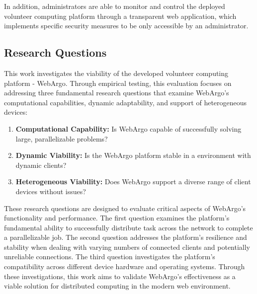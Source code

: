 In addition, administrators are able to monitor and control the deployed volunteer computing platform through a transparent web application, which implements specific security measures to be only accessible by an administrator.

\subsection{Research Questions}
\label{subsec:into:objectives:questions}
This work investigates the viability of the developed volunteer computing platform - WebArgo. Through empirical testing, this evaluation focuses on addressing three fundamental research questions that examine WebArgo's computational capabilities, dynamic adaptability, and support of heterogeneous devices:
\begin{enumerate}
    \item \textbf{Computational Capability:} Is WebArgo capable of successfully solving large, parallelizable problems?
    \item \textbf{Dynamic Viability:} Is the WebArgo platform stable in a environment with dynamic clients?
    \item \textbf{Heterogeneous Viability:} Does WebArgo support a diverse range of client devices without issues?
\end{enumerate}
These research questions are designed to evaluate critical aspects of WebArgo's functionality and performance. The first question examines the platform's fundamental ability to successfully distribute task across the network to complete a parallelizable job. The second question addresses the platform's resilience and stability when dealing with varying numbers of connected clients and potentially unreliable connections. The third question investigates the platform's compatibility across different device hardware and operating systems. Through these investigations, this work aims to validate WebArgo's effectiveness as a viable solution for distributed computing in the modern web environment.

